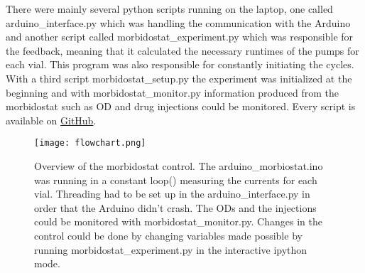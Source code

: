 There were mainly several python scripts running on the laptop, one called arduino\_interface.py which was handling the communication with the Arduino and another script called morbidostat\_experiment.py which was responsible for the feedback, meaning that it calculated the necessary runtimes of the pumps for each vial. This program was also responsible for constantly initiating the cycles. With a third script morbidostat\_setup.py the experiment was initialized at the beginning and with morbidostat\_monitor.py information produced from the morbidostat such as OD and drug injections could be monitored. Every script is available on \href{https://github.com/nahanoo/ESBL\_project/}{GitHub}. 
\begin{figure}[H]
	\texttt{[image: flowchart.png]}
	\caption{Overview of the morbidostat control. The arduino\_morbiostat.ino was running in a constant loop() measuring the currents for each vial. Threading had to be set up in the arduino\_interface.py in order that the Arduino didn't crash. The ODs and the injections could be monitored with morbidostat\_monitor.py. Changes in the control could be done by changing variables made possible by running morbidostat\_experiment.py in the interactive ipython mode.}
	\label{figure:flowchart}	
\end{figure}

